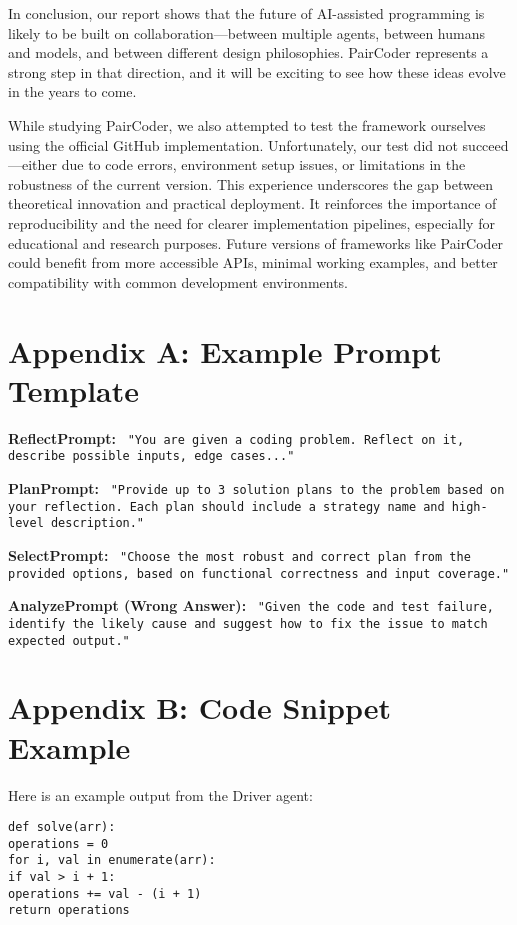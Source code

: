 \documentclass[11pt,a4paper]{article}
\begin{document}
In conclusion, our report shows that the future of AI-assisted programming is likely to be built on collaboration—between multiple agents, between humans and models, and between different design philosophies. PairCoder represents a strong step in that direction, and it will be exciting to see how these ideas evolve in the years to come.

While studying PairCoder, we also attempted to test the framework ourselves using the official GitHub implementation. Unfortunately, our test did not succeed—either due to code errors, environment setup issues, or limitations in the robustness of the current version. This experience underscores the gap between theoretical innovation and practical deployment. It reinforces the importance of reproducibility and the need for clearer implementation pipelines, especially for educational and research purposes. Future versions of frameworks like PairCoder could benefit from more accessible APIs, minimal working examples, and better compatibility with common development environments.




\newpage
\appendix
\appendix
\section{Appendix A: Example Prompt Template}
\textbf{ReflectPrompt:} \
\texttt{"You are given a coding problem. Reflect on it, describe possible inputs, edge cases..."}

\textbf{PlanPrompt:} \
\texttt{"Provide up to 3 solution plans to the problem based on your reflection. Each plan should include a strategy name and high-level description."}

\textbf{SelectPrompt:} \
\texttt{"Choose the most robust and correct plan from the provided options, based on functional correctness and input coverage."}

\textbf{AnalyzePrompt (Wrong Answer):} \
\texttt{"Given the code and test failure, identify the likely cause and suggest how to fix the issue to match expected output."}

\section{Appendix B: Code Snippet Example}
Here is an example output from the Driver agent:
\begin{verbatim}
def solve(arr):
operations = 0
for i, val in enumerate(arr):
if val > i + 1:
operations += val - (i + 1)
return operations
\end{verbatim}


\end{document}
